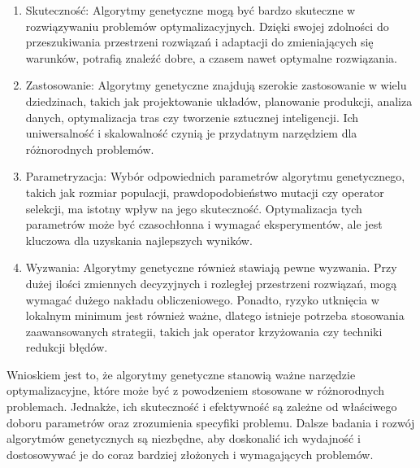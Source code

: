 \documentclass[11pt]{article}
\begin{document}
\begin{enumerate}
\def\labelenumi{\arabic{enumi}.}
\item
  Skuteczność: Algorytmy genetyczne mogą być bardzo skuteczne w
  rozwiązywaniu problemów optymalizacyjnych. Dzięki swojej zdolności do
  przeszukiwania przestrzeni rozwiązań i adaptacji do zmieniających się
  warunków, potrafią znaleźć dobre, a czasem nawet optymalne
  rozwiązania.
\item
  Zastosowanie: Algorytmy genetyczne znajdują szerokie zastosowanie w
  wielu dziedzinach, takich jak projektowanie układów, planowanie
  produkcji, analiza danych, optymalizacja tras czy tworzenie sztucznej
  inteligencji. Ich uniwersalność i skalowalność czynią je przydatnym
  narzędziem dla różnorodnych problemów.
\item
  Parametryzacja: Wybór odpowiednich parametrów algorytmu genetycznego,
  takich jak rozmiar populacji, prawdopodobieństwo mutacji czy operator
  selekcji, ma istotny wpływ na jego skuteczność. Optymalizacja tych
  parametrów może być czasochłonna i wymagać eksperymentów, ale jest
  kluczowa dla uzyskania najlepszych wyników.
\item
  Wyzwania: Algorytmy genetyczne również stawiają pewne wyzwania. Przy
  dużej ilości zmiennych decyzyjnych i rozległej przestrzeni rozwiązań,
  mogą wymagać dużego nakładu obliczeniowego. Ponadto, ryzyko utknięcia
  w lokalnym minimum jest również ważne, dlatego istnieje potrzeba
  stosowania zaawansowanych strategii, takich jak operator krzyżowania
  czy techniki redukcji błędów.
\end{enumerate}

Wnioskiem jest to, że algorytmy genetyczne stanowią ważne narzędzie
optymalizacyjne, które może być z powodzeniem stosowane w różnorodnych
problemach. Jednakże, ich skuteczność i efektywność są zależne od
właściwego doboru parametrów oraz zrozumienia specyfiki problemu. Dalsze
badania i rozwój algorytmów genetycznych są niezbędne, aby doskonalić
ich wydajność i dostosowywać je do coraz bardziej złożonych i
wymagających problemów.


    
    
    
\end{document}
